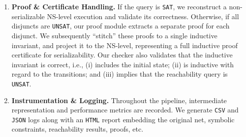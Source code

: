 \begin{enumerate}
	
	\item \textbf{Proof \& Certificate Handling.} If the query is \texttt{SAT}, we reconstruct a non-serializable NS-level execution and validate its correctness. Otherwise, if all disjuncts are \texttt{UNSAT}, our proof module extracts a separate proof for each disjunct. We subsequently ``stitch'' these proofs to a single inductive invariant, and project it to the NS-level, representing a full inductive proof certificate for serializability. Our checker also validates that the inductive invariant is correct, i.e., (i) includes the initial state; (ii) is inductive with regard to the transitions; and (iii) implies that the reachability query is \texttt{UNSAT}.
	
	
	\item \textbf{Instrumentation \& Logging.} Throughout the pipeline, intermediate representation and performance metrics 
are recorded. 
We generate \texttt{CSV} and \texttt{JSON} logs along with
an \texttt{HTML} report embedding the original net, symbolic constraints, reachability results, proofs, etc.
	
	
\end{enumerate}





